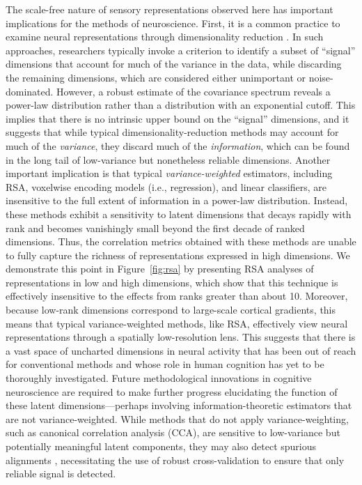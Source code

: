 \documentclass[10pt]{article}
\begin{document}
The scale-free nature of sensory representations observed here has important implications for the methods of neuroscience. First, it is a common practice to examine neural representations through dimensionality reduction \autocite{Cunningham2014,Huth2012,Haxby2011,Khosla2022,Lehky2014}. In such approaches, researchers typically invoke a criterion to identify a subset of ``signal'' dimensions that account for much of the variance in the data, while discarding the remaining dimensions, which are considered either unimportant or noise-dominated. However, a robust estimate of the covariance spectrum reveals a power-law distribution rather than a distribution with an exponential cutoff. This implies that there is no intrinsic upper bound on the ``signal'' dimensions, and it suggests that while typical dimensionality-reduction methods may account for much of the \emph{variance}, they discard much of the \emph{information}, which can be found in the long tail of low-variance but nonetheless reliable dimensions. Another important implication is that typical \emph{variance-weighted} estimators, including RSA, voxelwise encoding models (i.e., regression), and linear classifiers, are insensitive to the full extent of information in a power-law distribution. Instead, these methods exhibit a sensitivity to latent dimensions that decays rapidly with rank and becomes vanishingly small beyond the first decade of ranked dimensions. Thus, the correlation metrics obtained with these methods are unable to fully capture the richness of representations expressed in high dimensions. We demonstrate this point in Figure~\ref{fig:rsa} by presenting RSA analyses of representations in low and high dimensions, which show that this technique is effectively insensitive to the effects from ranks greater than about 10. Moreover, because low-rank dimensions correspond to large-scale cortical gradients, this means that typical variance-weighted methods, like RSA, effectively view neural representations through a spatially low-resolution lens. This suggests that there is a vast space of uncharted dimensions in neural activity that has been out of reach for conventional methods and whose role in human cognition has yet to be thoroughly investigated. Future methodological innovations in cognitive neuroscience are required to make further progress elucidating the function of these latent dimensions---perhaps involving information-theoretic estimators that are not variance-weighted. While methods that do not apply variance-weighting, such as canonical correlation analysis (CCA), are sensitive to low-variance but potentially meaningful latent components, they may also detect spurious alignments \autocite{Kornblith2019}, necessitating the use of robust cross-validation to ensure that only reliable signal is detected.
\end{document}

